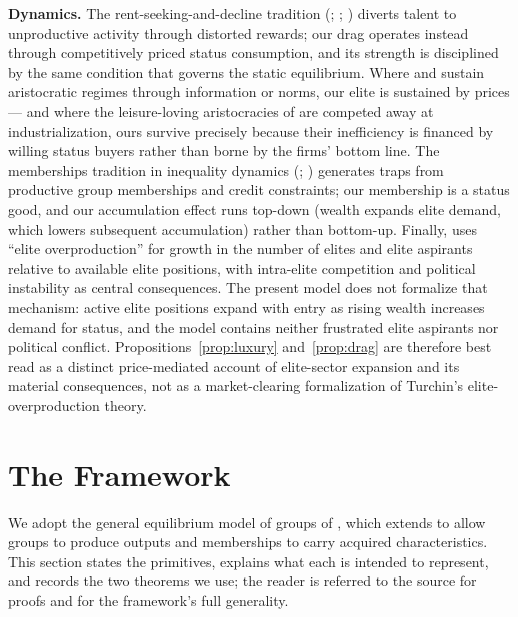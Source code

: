 \documentclass[12pt,letterpaper]{article}
\theoremstyle{definition}
\begin{document}
\textbf{Dynamics.}
The rent-seeking-and-decline tradition (\citealt{murphyshleifervishny1991}; \citealt{baumol1990entrepreneurship}; \citealt{acemoglu1995reward}) diverts talent to unproductive activity through distorted rewards; our drag operates instead through competitively priced status consumption, and its strength is disciplined by the same condition that governs the static equilibrium.
Where \citet{hasslermora2000} and \citet{colemailathpostlewaite1992} sustain aristocratic regimes through information or norms, our elite is sustained by prices --- and where the leisure-loving aristocracies of \citet{doepkezilibotti2008} are competed away at industrialization, ours survive precisely because their inefficiency is financed by willing status buyers rather than borne by the firms' bottom line.
The memberships tradition in inequality dynamics (\citealt{durlauf1996persistent}; \citealt{galorzeira1993}) generates traps from productive group memberships and credit constraints; our membership is a status good, and our accumulation effect runs top-down (wealth expands elite demand, which lowers subsequent accumulation) rather than bottom-up.
Finally, \citet{turchin2023endtimes} uses ``elite overproduction'' for growth in the number of elites and elite aspirants relative to available elite positions, with intra-elite competition and political instability as central consequences.
The present model does not formalize that mechanism: active elite positions expand with entry as rising wealth increases demand for status, and the model contains neither frustrated elite aspirants nor political conflict.
Propositions~\ref{prop:luxury} and~\ref{prop:drag} are therefore best read as a distinct price-mediated account of elite-sector expansion and its material consequences, not as a market-clearing formalization of Turchin's elite-overproduction theory.

\section{The Framework}\label{sec:framework}

We adopt the general equilibrium model of groups of \citet{ellickson2006organization}, which extends \citet{ellickson1999clubs} to allow groups to produce outputs and memberships to carry acquired characteristics.
This section states the primitives, explains what each is intended to represent, and records the two theorems we use; the reader is referred to the source for proofs and for the framework's full generality.
\end{document}
